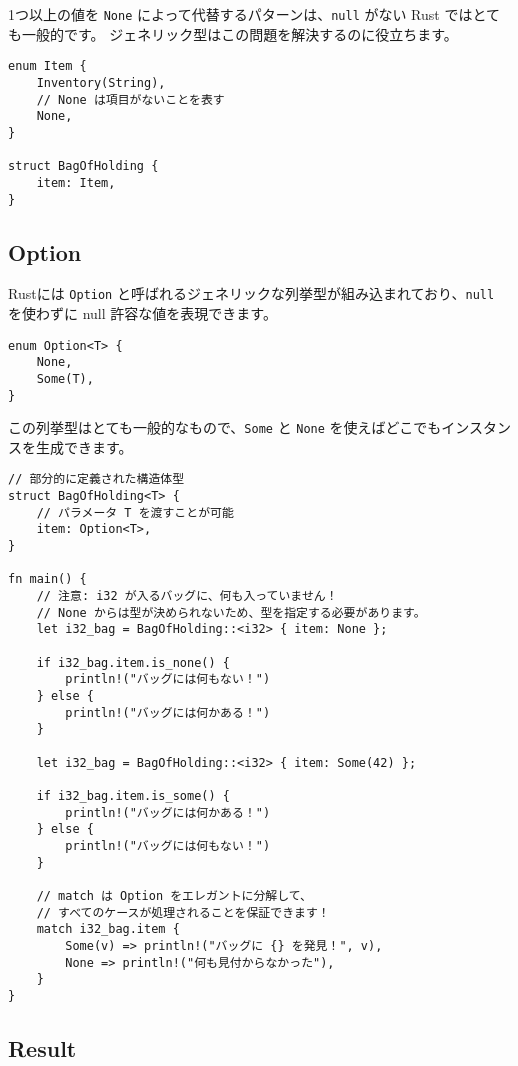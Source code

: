 1つ以上の値を \texttt{None} によって代替するパターンは、\texttt{null}
がない Rust ではとても一般的です。
ジェネリック型はこの問題を解決するのに役立ちます。

\begin{verbatim}
enum Item {
    Inventory(String),
    // None は項目がないことを表す
    None,
}

struct BagOfHolding {
    item: Item,
}
\end{verbatim}

\subsection{Option}

Rustには \texttt{Option}
と呼ばれるジェネリックな列挙型が組み込まれており、\texttt{null}
を使わずに null 許容な値を表現できます。

\begin{verbatim}
enum Option<T> {
    None,
    Some(T),
}
\end{verbatim}

この列挙型はとても一般的なもので、\texttt{Some} と \texttt{None}
を使えばどこでもインスタンスを生成できます。

\begin{verbatim}
// 部分的に定義された構造体型
struct BagOfHolding<T> {
    // パラメータ T を渡すことが可能
    item: Option<T>,
}

fn main() {
    // 注意: i32 が入るバッグに、何も入っていません！
    // None からは型が決められないため、型を指定する必要があります。
    let i32_bag = BagOfHolding::<i32> { item: None };

    if i32_bag.item.is_none() {
        println!("バッグには何もない！")
    } else {
        println!("バッグには何かある！")
    }

    let i32_bag = BagOfHolding::<i32> { item: Some(42) };

    if i32_bag.item.is_some() {
        println!("バッグには何かある！")
    } else {
        println!("バッグには何もない！")
    }

    // match は Option をエレガントに分解して、
    // すべてのケースが処理されることを保証できます！
    match i32_bag.item {
        Some(v) => println!("バッグに {} を発見！", v),
        None => println!("何も見付からなかった"),
    }
}
\end{verbatim}

\subsection{Result}

